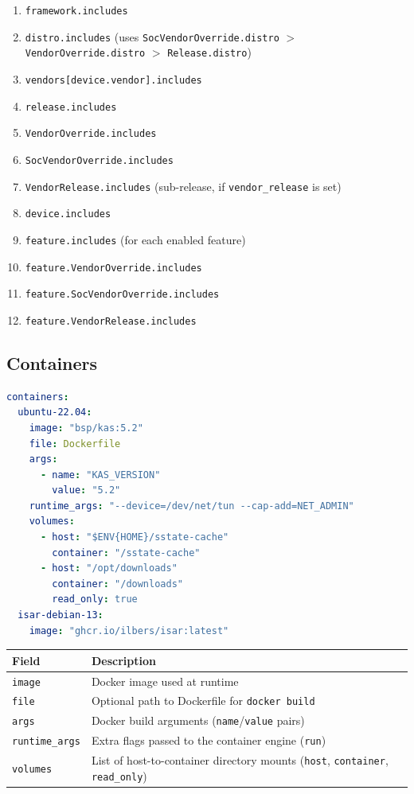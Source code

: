 \documentclass[a4paper,11pt]{article}
\begin{document}
\begin{enumerate}
  \item \texttt{framework.includes}
  \item \texttt{distro.includes}
        (uses \texttt{SocVendorOverride.distro} $>$ \texttt{VendorOverride.distro} $>$
         \texttt{Release.distro})
  \item \texttt{vendors[device.vendor].includes}
  \item \texttt{release.includes}
  \item \texttt{VendorOverride.includes}
  \item \texttt{SocVendorOverride.includes}
  \item \texttt{VendorRelease.includes} (sub-release, if \texttt{vendor\_release} is set)
  \item \texttt{device.includes}
  \item \texttt{feature.includes} (for each enabled feature)
  \item \texttt{feature.VendorOverride.includes}
  \item \texttt{feature.SocVendorOverride.includes}
  \item \texttt{feature.VendorRelease.includes}
\end{enumerate}

\subsection{Containers}

\begin{lstlisting}[language=YAML]
containers:
  ubuntu-22.04:
    image: "bsp/kas:5.2"
    file: Dockerfile
    args:
      - name: "KAS_VERSION"
        value: "5.2"
    runtime_args: "--device=/dev/net/tun --cap-add=NET_ADMIN"
    volumes:
      - host: "$ENV{HOME}/sstate-cache"
        container: "/sstate-cache"
      - host: "/opt/downloads"
        container: "/downloads"
        read_only: true
  isar-debian-13:
    image: "ghcr.io/ilbers/isar:latest"
\end{lstlisting}

\begin{tabularx}{\linewidth}{L{32mm}X}
  \textbf{Field} & \textbf{Description} \\
  \toprule
   \texttt{image}        & Docker image used at runtime \\
    \texttt{file}         & Optional path to Dockerfile for \texttt{docker build} \\
   \texttt{args}         & Docker build arguments (\texttt{name}/\texttt{value} pairs) \\
    \texttt{runtime\_args}& Extra flags passed to the container engine (\texttt{run}) \\
   \texttt{volumes}      & List of host-to-container directory mounts (\texttt{host}, \texttt{container}, \texttt{read\_only}) \\
  \bottomrule
\end{tabularx}
\end{document}
